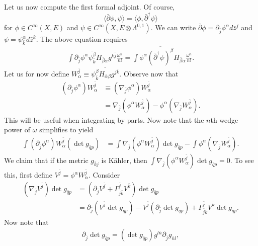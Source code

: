 \documentclass{../mathnotes}
\begin{document}
Let us now compute the first formal adjoint. Of course,
\[\langle\bar\partial\phi,\psi\rangle=\langle\phi,\bar\partial^\dagger\psi\rangle\]
for $\phi\in C^\infty(X,E)$ and $\psi\in C^\infty(X,E\otimes\Lambda^{0,1})$. We can write $\bar\partial\phi=\partial_{\bar j}\phi^\alpha d\bar z^j$
and $\psi=\psi^{\alpha}_{\bar k}d\bar z^k$. The above equation requires
\begin{align*}
    \int \partial_{\bar j}\phi^\alpha\overline{\psi^\beta_{\bar k}}H_{\bar \beta\alpha}g^{k\bar j}\frac{\omega^n}{n!}=\int\phi^\alpha\overline{\left( \bar\partial^\dagger\psi \right)^\beta}H_{\bar\beta\alpha}\frac{\omega^n}{n!}.
\end{align*}
Let us for now define $W_\alpha^{\bar j}\equiv \overline{\psi^\beta_{\bar k}H_{\bar\alpha\beta}g^{j\bar k}}$. Observe now that
\begin{align*}
    \left( \partial_{\bar j}\phi^\alpha \right)W^{\bar j}_\alpha&\equiv\left( \nabla_{\bar j}\phi^\alpha \right)W^{\bar j}_\alpha\\
    &=\nabla_{\bar j}\left( \phi^\alpha W^{\bar j}_\alpha \right)-\phi^\alpha\left( \nabla_{\bar j} W^{\bar j}_\alpha\right).
\end{align*}
This will be useful when integrating by parts.
Now note that the $n$th wedge power of $\omega$ simplifies to yield
\begin{align*}
    \int\left( \partial_{\bar j}\phi^\alpha \right)W_\alpha^{\bar j}\left( \det g_{\bar qp} \right)&=\int\nabla_{\bar j}\left( \phi^\alpha W^{\bar j}_\alpha \right)\det g_{\bar qp}
    -\int \phi^\alpha\left( \nabla_{\bar j}W^{\bar j}_\alpha \right).
\end{align*}
We claim that if the metric $g_{\bar kj}$ is K\"ahler, then $\int \nabla_{\bar j}(\phi^\alpha W_\alpha^{\bar j})\det g_{\bar qp}=0$. To see this, first define
$V^{\bar j}=\phi^\alpha W_\alpha^{\bar j}$. Consider
\begin{align*}
    \left( \nabla_{\bar j}V^{\bar j} \right)\det g_{\bar qp}&=\left(\partial_{\bar j}V^{\bar j}+\Gamma^{\bar j}_{\bar j\bar k}V^{\bar k}\right)\det g_{\bar qp}\\
    &=\partial_{\bar j}\left( V^{\bar j}\det g_{\bar qp} \right)-V^{\bar j}\left( \partial_{\bar j}\det g_{\bar qp} \right)+\Gamma^{\bar j}_{\bar j\bar k}V^{\bar k}\det g_{\bar qp}.
\end{align*}
Now note that
\begin{align*}
    \partial_{\bar j}\det g_{\bar qp}=\left( \det g_{\bar qp}\right)g^{l\bar n}\partial_{\bar j}g_{\bar nl},
\end{align*}
\end{document}
